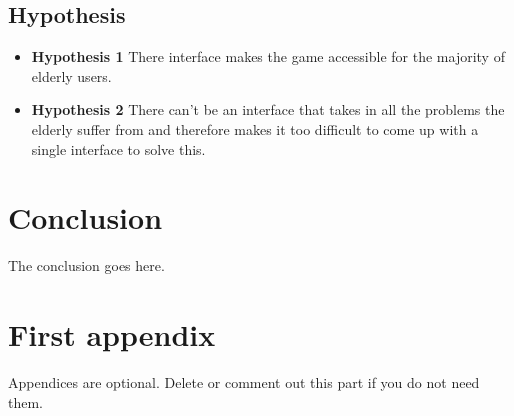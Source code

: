 \documentclass[journal]{IEEEtran}
\begin{document}
\subsection{Hypothesis}
\begin{itemize}
	\item \textbf{Hypothesis 1} There interface makes the game accessible for the majority of elderly users.
	\item \textbf{Hypothesis 2} There can't be an interface that takes in all the problems the elderly suffer from and therefore makes it too difficult to come up with a single interface to solve this.
\end{itemize}


\section{Conclusion}
The conclusion goes here.






\appendices
\section{First appendix}
Appendices are optional. Delete or comment out this part if you do not need them.

\end{document}
